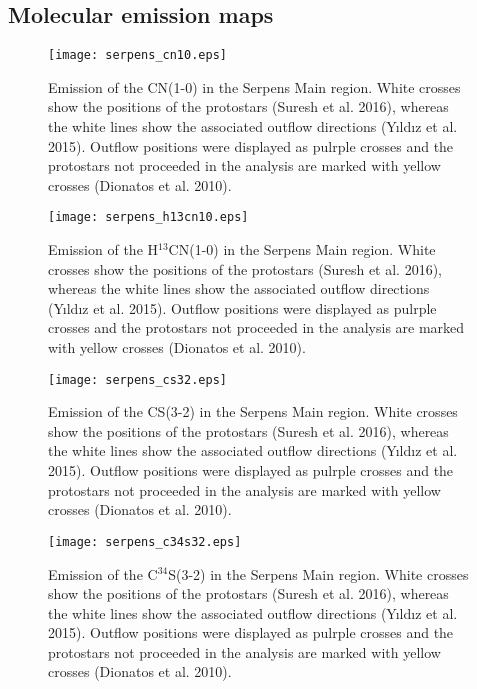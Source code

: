 \documentclass{aa}
\begin{document}
\begin{appendix} %
\section{Molecular emission maps}
\begin{figure}
\texttt{[image: serpens\_cn10.eps]}
\caption{Emission of the CN(1-0) in the Serpens Main region. White crosses show the positions of the protostars (Suresh et al. 2016), whereas the white lines show the associated outflow directions (Y{\i}ld{\i}z et al. 2015). Outflow positions were displayed as pulrple crosses and the protostars not proceeded in the analysis are marked with yellow crosses (Dionatos et al. 2010).}
\label{cn10}
\end{figure}

\begin{figure}
\texttt{[image: serpens\_h13cn10.eps]}
\caption{Emission of the H$^{13}$CN(1-0) in the Serpens Main region. White crosses show the positions of the protostars (Suresh et al. 2016), whereas the white lines show the associated outflow directions (Y{\i}ld{\i}z et al. 2015). Outflow positions were displayed as pulrple crosses and the protostars not proceeded in the analysis are marked with yellow crosses (Dionatos et al. 2010).}
\label{h13cn10}
\end{figure}

\begin{figure}
\texttt{[image: serpens\_cs32.eps]}
\caption{Emission of the CS(3-2) in the Serpens Main region. White crosses show the positions of the protostars (Suresh et al. 2016), whereas the white lines show the associated outflow directions (Y{\i}ld{\i}z et al. 2015). Outflow positions were displayed as pulrple crosses and the protostars not proceeded in the analysis are marked with yellow crosses (Dionatos et al. 2010).}
\label{cs32}
\end{figure}

\begin{figure}
\texttt{[image: serpens\_c34s32.eps]}
\caption{Emission of the C$^{34}$S(3-2) in the Serpens Main region. White crosses show the positions of the protostars (Suresh et al. 2016), whereas the white lines show the associated outflow directions (Y{\i}ld{\i}z et al. 2015). Outflow positions were displayed as pulrple crosses and the protostars not proceeded in the analysis are marked with yellow crosses (Dionatos et al. 2010).}
\label{c34s32}
\end{figure}

\end{appendix}
\end{document}
